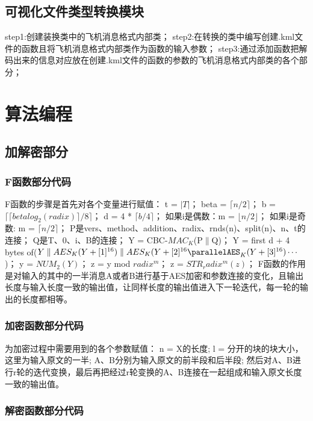 \subsection{可视化文件类型转换模块}
step1:创建装换类中的飞机消息格式内部类；\newline
step2:在转换的类中编写创建.kml文件的函数且将飞机消息格式内部类作为函数的输入参数；\newline
step3:通过添加函数把解码出来的信息对应放在创建.kml文件的函数的参数的飞机消息格式内部类的各个部分；

\section{算法编程}
\subsection{加解密部分}
\subsubsection{F函数部分代码}


        
F函数的步骤是首先对各个变量进行赋值：
t = $|T|$；
beta = $\lceil n/2 \rceil$；
b = $\lceil \lceil beta log_2(radix)\rceil /8 \rceil$；
d = 4 * $\lceil b/4 \rceil$；
如果i是偶数：m = $\lfloor n/2 \rfloor$；
如果i是奇数: m = $\lceil n/2 \rceil$；
P是vers、method、addition、radix、rnds(n)、split(n)、n、t的连接；
Q是T、0、i、B的连接；
Y = CBC-$MAC_K$(P$\parallel$Q)；
Y = first d + 4 bytes of($Y \parallel AES_K(Y+[1]^{16})\parallel AES_K(Y + [2]^{16} \parallelAES_K(Y+[3]^{16})\cdots$)；
y = $NUM_2(Y)$；
z = y mod $radix^m$；
z = $STR_radix^m(z)$；      
F函数的作用是对输入的其中的一半消息A或者B进行基于AES加密和参数连接的变化，且输出长度与输入长度一致的输出值，让同样长度的输出值进入下一轮迭代，每一轮的输出的长度都相等。
       
\subsubsection{加密函数部分代码}



为加密过程中需要用到的各个参数赋值：
n = X的长度;
l = 分开的块的块大小，这里为输入原文的一半;
A、B分别为输入原文的前半段和后半段;
然后对A、B进行r轮的迭代变换，最后再把经过r轮变换的A、B连接在一起组成和输入原文长度一致的输出值。
\subsubsection{解密函数部分代码}
       
